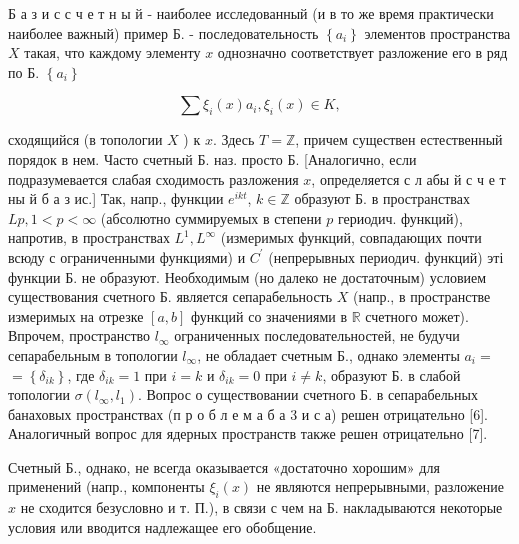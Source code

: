 \documentclass[10pt]{article}
\begin{document}
Б а з и с с ч е т н ы й - наиболее исследованный (и в то же время практически наиболее важный) пример Б. - последовательность $\left\{a_{i}\right\}$ элементов пространства $X$ такая, что каждому элементу $x$ однозначно соответствует разложение его в ряд по Б. $\left\{a_{i}\right\}$



\[

\sum \xi_{i}(x) a_{i}, \xi_{i}(x) \in K,

\]



сходящийся (в топологии $X$ ) к $x$. Здесь $T=\mathbb{Z}$, причем существен естественный порядок в нем. Часто счетный Б. наз. просто Б. [Аналогично, если подразумевается слабая сходимость разложения $x$, определяется с л абы й с ч е т ны й б а з ис.] Так, напр., функции $e^{i k t}$, $k \in \mathbb{Z}$ образуют Б. в пространствах $L p, 1<p<\infty$ (абсолютно суммируемых в степени $p$ гериодич. функций), напротив, в пространствах $L^{1}, L^{\infty}$ (измеримых функций, совпадающих почти всюду с ограниченными функциями) и $C^{\prime}$ (непрерывных периодич. функций) эті функции Б. не образуют. Необходимым (но далеко не достаточным) условием существования счетного Б. является сепарабельность $X$ (напр., в пространстве измеримых на отрезке $[a, b]$ функций со значениями в $\mathbb{R}$ счетного может). Впрочем, пространство $l_{\infty}$ ограниченных последовательностей, не будучи сепарабельным в топологии $l_{\infty}$, не обладает счетным Б., однако элементы $a_{i}=$ $=\left\{\delta_{i k}\right\}$, где $\delta_{i k}=1$ при $i=k$ и $\delta_{i k}=0$ при $i \neq k$, образуют Б. в слабой топологии $\sigma\left(l_{\infty}, l_{1}\right)$. Вопрос о существовании счетного Б. в сепарабельных банаховых пространствах (п р о б л е м а б а 3 и с а) решен отрицательно [6]. Аналогичный вопрос для ядерных пространств также решен отрицательно [7].



Счетный Б., однако, не всегда оказывается «достаточно хорошим» для применений (напр., компоненты $\xi_{i}(x)$ не являются непрерывными, разложение $x$ не сходится безусловно и т. П.), в связи с чем на Б. накладываются некоторые условия или вводится надлежащее его обобщение.
\end{document}
